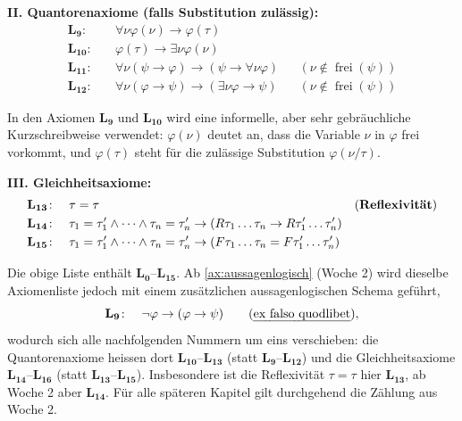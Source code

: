 \begin{math-stroke}
\textbf{II. Quantorenaxiome (falls Substitution zulässig):}
\begin{align}
    \mathbf{L_9}\colon &\quad \forall \nu \varphi(\nu) \rightarrow \varphi(\tau) \nonumber \\
    \mathbf{L_{10}}\colon &\quad \varphi(\tau) \rightarrow \exists \nu \varphi(\nu) \nonumber \\
    \mathbf{L_{11}}\colon &\quad \forall \nu (\psi \rightarrow \varphi) \rightarrow (\psi \rightarrow \forall \nu \varphi) && (\nu \notin \operatorname{frei}(\psi)) \nonumber \\
    \mathbf{L_{12}}\colon &\quad \forall \nu (\varphi \rightarrow \psi) \rightarrow (\exists \nu \varphi \rightarrow \psi) && (\nu \notin \operatorname{frei}(\psi)) \nonumber
\end{align}

\begin{explanation-of-steps}
In den Axiomen $\mathbf{L_9}$ und $\mathbf{L_{10}}$ wird eine informelle, aber sehr gebräuchliche Kurzschreibweise verwendet: $\varphi(\nu)$ deutet an, dass die Variable $\nu$ in $\varphi$ frei vorkommt, und $\varphi(\tau)$ steht für die zulässige Substitution $\varphi(\nu/\tau)$.
\end{explanation-of-steps}

\textbf{III. Gleichheitsaxiome:}
\begin{align}
    \mathbf{L_{13}}\colon &\quad \tau = \tau && \text{(\textbf{Reflexivität})} \nonumber \\
    \mathbf{L_{14}}\colon &\quad \tau_1 = \tau_1' \wedge \dots \wedge \tau_n = \tau_n' \rightarrow (R\tau_1 \dots \tau_n \rightarrow R\tau_1' \dots \tau_n') \nonumber \\
    \mathbf{L_{15}}\colon &\quad \tau_1 = \tau_1' \wedge \dots \wedge \tau_n = \tau_n' \rightarrow (F\tau_1 \dots \tau_n = F\tau_1' \dots \tau_n') \nonumber
\end{align}
\end{math-stroke}

\begin{ai-note}
Die obige Liste enthält $\mathbf{L_0}$--$\mathbf{L_{15}}$. Ab \cref{ax:aussagenlogisch} (Woche 2) wird dieselbe Axiomenliste jedoch mit einem zusätzlichen aussagenlogischen Schema geführt,
\[ \mathbf{L_9}\colon \quad \neg \varphi \rightarrow (\varphi \rightarrow \psi) \qquad \text{(\emph{ex falso quodlibet})}, \]
wodurch sich alle nachfolgenden Nummern um eins verschieben: die Quantorenaxiome heissen dort $\mathbf{L_{10}}$--$\mathbf{L_{13}}$ (statt $\mathbf{L_9}$--$\mathbf{L_{12}}$) und die Gleichheitsaxiome $\mathbf{L_{14}}$--$\mathbf{L_{16}}$ (statt $\mathbf{L_{13}}$--$\mathbf{L_{15}}$). Insbesondere ist die Reflexivität $\tau = \tau$ hier $\mathbf{L_{13}}$, ab Woche 2 aber $\mathbf{L_{14}}$. Für alle späteren Kapitel gilt durchgehend die Zählung aus Woche 2.
\end{ai-note}


